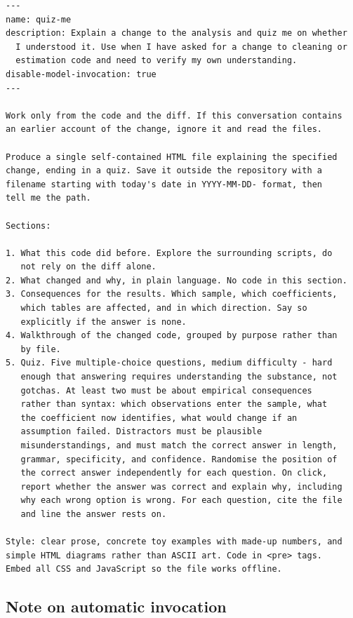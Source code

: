 \documentclass[11pt,a4paper]{article}
\begin{document}
\begin{promptbox}
\begin{Verbatim}[breaklines,fontsize=\footnotesize]
---
name: quiz-me
description: Explain a change to the analysis and quiz me on whether
  I understood it. Use when I have asked for a change to cleaning or
  estimation code and need to verify my own understanding.
disable-model-invocation: true
---

Work only from the code and the diff. If this conversation contains
an earlier account of the change, ignore it and read the files.

Produce a single self-contained HTML file explaining the specified
change, ending in a quiz. Save it outside the repository with a
filename starting with today's date in YYYY-MM-DD- format, then
tell me the path.

Sections:

1. What this code did before. Explore the surrounding scripts, do
   not rely on the diff alone.
2. What changed and why, in plain language. No code in this section.
3. Consequences for the results. Which sample, which coefficients,
   which tables are affected, and in which direction. Say so
   explicitly if the answer is none.
4. Walkthrough of the changed code, grouped by purpose rather than
   by file.
5. Quiz. Five multiple-choice questions, medium difficulty - hard
   enough that answering requires understanding the substance, not
   gotchas. At least two must be about empirical consequences
   rather than syntax: which observations enter the sample, what
   the coefficient now identifies, what would change if an
   assumption failed. Distractors must be plausible
   misunderstandings, and must match the correct answer in length,
   grammar, specificity, and confidence. Randomise the position of
   the correct answer independently for each question. On click,
   report whether the answer was correct and explain why, including
   why each wrong option is wrong. For each question, cite the file
   and line the answer rests on.

Style: clear prose, concrete toy examples with made-up numbers, and
simple HTML diagrams rather than ASCII art. Code in <pre> tags.
Embed all CSS and JavaScript so the file works offline.
\end{Verbatim}
\end{promptbox}

\subsection{Note on automatic invocation}
\end{document}
